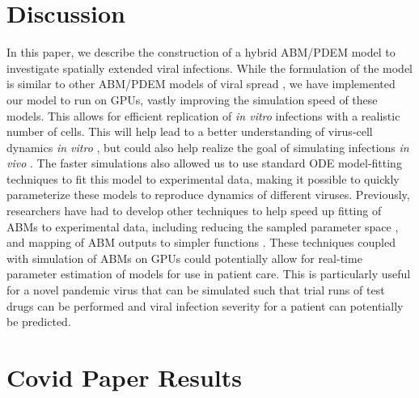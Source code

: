 \section{Discussion}

In this paper, we describe the construction of a hybrid ABM/PDEM model to investigate spatially extended viral infections. While the formulation of the model is similar to other ABM/PDEM models of viral spread \cite{beauchemin_simple_2005, bauer_agent-based_2009}, we have implemented our model to run on GPUs, vastly improving the simulation speed of these models. This allows for efficient replication of \emph{in vitro} infections with a realistic number of cells. This will help lead to a better understanding of virus-cell dynamics \emph{in vitro} \cite{blahut21}, but could also help realize the goal of simulating infections \emph{in vivo} \cite{laubenbacher21}. The faster simulations also allowed us to use standard ODE model-fitting techniques to fit this model to experimental data, making it possible to quickly parameterize these models to reproduce dynamics of different viruses. Previously, researchers have had to develop other techniques to help speed up fitting of ABMs to experimental data, including reducing the sampled parameter space \cite{li17}, and mapping of ABM outputs to simpler functions \cite{tong_development_2015, read16}. These techniques coupled with simulation of ABMs on GPUs could potentially allow for real-time parameter estimation of models for use in patient care. This is particularly useful for a novel pandemic virus that can be simulated such that trial runs of test drugs can be performed and viral infection severity for a patient can potentially be predicted. 


\section{Covid Paper Results}

